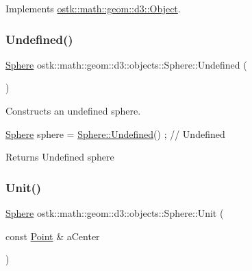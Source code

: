 Implements \hyperlink{classostk_1_1math_1_1geom_1_1d3_1_1_object_ab2a2a782503b97d1cecabdfedc636fce}{ostk\+::math\+::geom\+::d3\+::\+Object}.

\mbox{\label{classostk_1_1math_1_1geom_1_1d3_1_1objects_1_1_sphere_ae5092dbaff1a7827de173fd61c8aa0df}} 
\subsubsection{\texorpdfstring{Undefined()}{Undefined()}}
{\footnotesize\ttfamily \hyperlink{classostk_1_1math_1_1geom_1_1d3_1_1objects_1_1_sphere}{Sphere} ostk\+::math\+::geom\+::d3\+::objects\+::\+Sphere\+::\+Undefined (\begin{DoxyParamCaption}{ }\end{DoxyParamCaption})\hspace{0.3cm}{\ttfamily [static]}}



Constructs an undefined sphere. 


\begin{DoxyCode}
\hyperlink{classostk_1_1math_1_1geom_1_1d3_1_1objects_1_1_sphere_a6920f72260a7b2c9ffc29283540e16c2}{Sphere} sphere = \hyperlink{classostk_1_1math_1_1geom_1_1d3_1_1objects_1_1_sphere_ae5092dbaff1a7827de173fd61c8aa0df}{Sphere::Undefined}() ; \textcolor{comment}{// Undefined}
\end{DoxyCode}


\begin{DoxyReturn}{Returns}
Undefined sphere 
\end{DoxyReturn}
\mbox{\label{classostk_1_1math_1_1geom_1_1d3_1_1objects_1_1_sphere_a5e0bd57337eb7e5c7eb19b66176d560b}} 
\subsubsection{\texorpdfstring{Unit()}{Unit()}}
{\footnotesize\ttfamily \hyperlink{classostk_1_1math_1_1geom_1_1d3_1_1objects_1_1_sphere}{Sphere} ostk\+::math\+::geom\+::d3\+::objects\+::\+Sphere\+::\+Unit (\begin{DoxyParamCaption}\item[{const \hyperlink{classostk_1_1math_1_1geom_1_1d3_1_1objects_1_1_point}{Point} \&}]{a\+Center }\end{DoxyParamCaption})\hspace{0.3cm}{\ttfamily [static]}}



